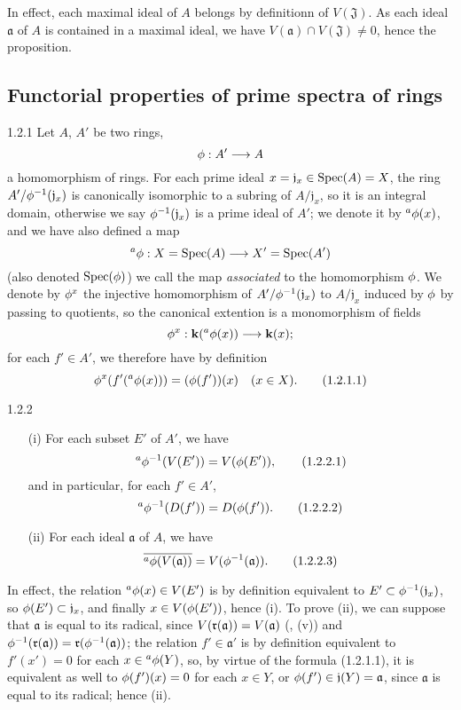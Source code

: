 \documentclass[10pt,oneside]{book}
\begin{document}
In effect, each maximal ideal of $A$ belongs by definitionn of $V(\mathfrak{J})$.
As each ideal $\mathfrak{a}$ of $A$ is contained in a maximal ideal, we have
$V(\mathfrak{a})\cap V(\mathfrak{J})\neq 0$, hence the proposition.

\subsection{Functorial properties of prime spectra of rings}
\label{1-schemes-1.2}       

\begin{env}{1.2.1}
\label{env-1.1.2.1}
Let $A$, $A'$ be two rings,
\[
  \phi:A'\longrightarrow A
\]
a homomorphism of rings. For each prime ideal $x=\mathfrak{j}_x\in{\mathop{\mathrm{Spec}}\nolimits}(A)=X$, the
ring $A'/\phi^{-1}(\mathfrak{j}_x)$ is canonically isomorphic to a subring of
$A/\mathfrak{j}_x$, so it is an integral domain, otherwise we say
$\phi^{-1}(\mathfrak{j}_x)$ is a prime ideal of $A'$; we denote it by
$^a\phi(x)$, and we have also defined a map
\[
  ^a\phi:X={\mathop{\mathrm{Spec}}\nolimits}(A)\longrightarrow X'={\mathop{\mathrm{Spec}}\nolimits}(A')
\]
(also denoted ${\mathop{\mathrm{Spec}}\nolimits}(\phi)$) we call the map \emph{associated} to the
homomorphism $\phi$. We denote by $\phi^x$ the injective homomorphism of
$A'/\phi^{-1}(\mathfrak{j}_x)$ to $A/\mathfrak{j}_x$ induced by $\phi$ by
passing to quotients, so the canonical extention is a monomorphism of fields
\[
  \phi^x:\mathbf{k}(^a\phi(x))\longrightarrow\mathbf{k}(x);
\]
for each $f'\in A'$, we therefore have by definition
\[
  \phi^x(f'(^a\phi(x)))=(\phi(f'))(x)\quad(x\in X).\tag{1.2.1.1}
\]
\end{env}

\begin{envs}[Proposition]{1.2.2}
\label{prop-1.1.2.2}
\begin{itemize}
  \item[(i)] For each subset $E'$ of $A'$, we have
             \[
               ^a\phi^{-1}(V(E'))=V(\phi(E')),\tag{1.2.2.1}
             \]
             and in particular, for each $f'\in A'$,
             \[
               ^a\phi^{-1}(D(f'))=D(\phi(f')).\tag{1.2.2.2}
             \]
  \item[(ii)] For each ideal $\mathfrak{a}$ of $A$, we have
              \[
                \overline{^a\phi(V(\mathfrak{a}))}=V(\phi^{-1}(\mathfrak{a})).
                \tag{1.2.2.3}
              \]
\end{itemize}
\end{envs}

In effect, the relation $^a\phi(x)\in V(E')$ is by definition equivalent to
$E'\subset\phi^{-1}(\mathfrak{j}_x)$, so $\phi(E')\subset\mathfrak{j}_x$, and
finally $x\in V(\phi(E'))$, hence (i). To prove (ii), we can suppose that
$\mathfrak{a}$ is equal to its radical, since $V(\mathfrak{r}(\mathfrak{a}))=V(\mathfrak{a})$
(, (v)) and
$\phi^{-1}(\mathfrak{r}(\mathfrak{a}))=\mathfrak{r}(\phi^{-1}(\mathfrak{a}))$; the relation
$f'\in\mathfrak{a}'$ is by definition equivalent to $f'(x')=0$ for each
$x\in{^a\phi(Y)}$, so, by virtue of the formula (1.2.1.1), it is equivalent as well
to $\phi(f')(x)=0$ for each $x\in Y$, or $\phi(f')\in\mathfrak{j}(Y)=\mathfrak{a}$,
since $\mathfrak{a}$ is equal to its radical; hence (ii).
\end{document}
